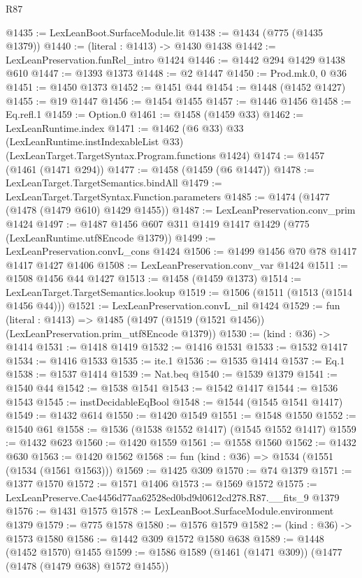\begin{lexlean}{R87}
\begin{coremodule}
{{@1435 := LexLeanBoot.SurfaceModule.lit
@1438 := @1434 (@775 (@1435 @1379))
@1440 := (literal : @1413) -> @1430 @1438
@1442 := LexLeanPreservation.funRel_intro @1424
@1446 := @1442 @294 @1429 @1438 @610
@1447 := @1393 @1373
@1448 := @2 @1447
@1450 := Prod.mk.{0, 0} @36
@1451 := @1450 @1373
@1452 := @1451 @44
@1454 := @1448 (@1452 @1427)
@1455 := @19 @1447
@1456 := @1454 @1455
@1457 := @1446 @1456
@1458 := Eq.refl.{1}
@1459 := Option.{0}
@1461 := @1458 (@1459 @33)
@1462 := LexLeanRuntime.index
@1471 := @1462
    (@6 @33)
    @33
    (LexLeanRuntime.instIndexableList @33)
    (LexLeanTarget.TargetSyntax.Program.functions @1424)
@1474 := @1457 (@1461 (@1471 @294))
@1477 := @1458 (@1459 (@6 @1447))
@1478 := LexLeanTarget.TargetSemantics.bindAll
@1479 := LexLeanTarget.TargetSyntax.Function.parameters
@1485 := @1474 (@1477 (@1478 (@1479 @610) @1429 @1455))
@1487 := LexLeanPreservation.conv_prim @1424
@1497 := @1487 @1456 @607 @311 @1419 @1417 @1429 (@775 (LexLeanRuntime.utf8Encode @1379))
@1499 := LexLeanPreservation.convL_cons @1424
@1506 := @1499 @1456 @70 @78 @1417 @1417 @1427 @1406
@1508 := LexLeanPreservation.conv_var @1424
@1511 := @1508 @1456 @44 @1427
@1513 := @1458 (@1459 @1373)
@1514 := LexLeanTarget.TargetSemantics.lookup
@1519 := @1506 (@1511 (@1513 (@1514 @1456 @44)))
@1521 := LexLeanPreservation.convL_nil @1424
@1529 := fun (literal : @1413) =>
  @1485 (@1497 (@1519 (@1521 @1456)) (LexLeanPreservation.prim_utf8Encode @1379))
@1530 := (kind : @36) -> @1414
@1531 := @1418 @1419
@1532 := @1416 @1531
@1533 := @1532 @1417
@1534 := @1416 @1533
@1535 := ite.{1}
@1536 := @1535 @1414
@1537 := Eq.{1}
@1538 := @1537 @1414
@1539 := Nat.beq
@1540 := @1539 @1379
@1541 := @1540 @44
@1542 := @1538 @1541
@1543 := @1542 @1417
@1544 := @1536 @1543
@1545 := instDecidableEqBool
@1548 := @1544 (@1545 @1541 @1417)
@1549 := @1432 @614
@1550 := @1420 @1549
@1551 := @1548 @1550
@1552 := @1540 @61
@1558 := @1536 (@1538 @1552 @1417) (@1545 @1552 @1417)
@1559 := @1432 @623
@1560 := @1420 @1559
@1561 := @1558 @1560
@1562 := @1432 @630
@1563 := @1420 @1562
@1568 := fun (kind : @36) => @1534 (@1551 (@1534 (@1561 @1563)))
@1569 := @1425 @309
@1570 := @74 @1379
@1571 := @1377 @1570
@1572 := @1571 @1406
@1573 := @1569 @1572
@1575 := LexLeanPreserve.Cae4456d77aa62528ed0bd9d0612cd278.R87.__fits_9 @1379
@1576 := @1431 @1575
@1578 := LexLeanBoot.SurfaceModule.environment @1379
@1579 := @775 @1578
@1580 := @1576 @1579
@1582 := (kind : @36) -> @1573 @1580
@1586 := @1442 @309 @1572 @1580 @638
@1589 := @1448 (@1452 @1570) @1455
@1599 := @1586 @1589 (@1461 (@1471 @309)) (@1477 (@1478 (@1479 @638) @1572 @1455))
}}
\end{coremodule}
\end{lexlean}
